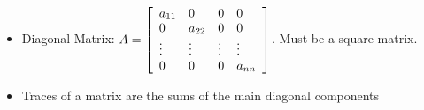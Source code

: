 \documentclass[12pt]{article}
\begin{document}
\begin{itemize}
\begin{enumerate}
\begin{enumerate}
        \end{enumerate}

    \end{enumerate}

  \item Diagonal Matrix: $A=\left[ \begin{array}{l l l l} a_{11} & 0 & 0 & 0 \\ 0 & a_{22} & 0 & 0 \\ \vdots & \vdots & \vdots & \vdots \\ 0 & 0 & 0 & a_{nn} \end{array}\right]$. Must be a square matrix.

  \item Traces of a matrix are the sums of the main diagonal components

\end{itemize}
\end{document}
